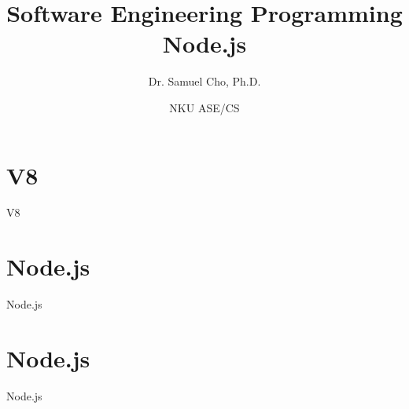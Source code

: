 \documentclass[handout, 14pt]{beamer}
\begin{document}
\title[SE Programming]{Software Engineering Programming\\Node.js}
\author{Dr. Samuel Cho, Ph.D.} 
\date{NKU ASE/CS} 

\frame{\titlepage} 

\begin{frame}[fragile]{}
\begin{center} 
    \tableofcontents
\end{center}
\end{frame}

\def\name{V8}
\section{\name}
\begin{frame}[fragile]{}%
\begin{center}%
%
%
\name
\end{center}%
\end{frame}
 

\def\name{Node.js}
\section{\name}
\begin{frame}[fragile]{}%
\begin{center}%
%
%
\name
\end{center}%
\end{frame}


\def\name{Node.js}
\section{\name}
\begin{frame}[fragile]{}%
\begin{center}%
%
%
\name
\end{center}%
\end{frame}
 
\end{document}
